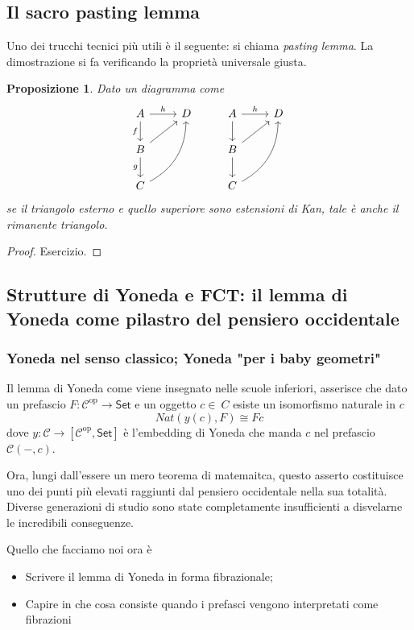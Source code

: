 \documentclass[11pt]{article}
\def\C{\mathcal{C}}
\def\Set{\mathsf{Set}}
\def\opp{\mathrm{op}}
\theoremstyle{reference}
\newtheorem{proposition}[theorem]{Proposizione}
\begin{document}
\subsection{Il sacro pasting lemma}
\label{sec:org734c8d9}

Uno dei trucchi tecnici più utili è il seguente: si chiama
\emph{pasting lemma}. La dimostrazione si fa verificando la
proprietà universale giusta.
\begin{proposition}
Dato un diagramma come
$$
\begin{tikzcd}
|[alias=a]|A \ar[r,"h"]\ar[d,"f"']&|[alias=d]| D &|[alias=a']| A \ar[d]\ar[r,"h"]&|[alias=d']| D \\
B \ar[d,"g"']\ar[ur]&&|[alias=b']| B \ar[d]\ar[ur]\\
|[alias=c]|C \ar[bend right,uur] && C\ar[bend right,uur] 
\end{tikzcd}
$$
se il triangolo esterno e quello superiore sono estensioni di Kan, tale è anche il rimanente triangolo.
\end{proposition}
\begin{proof}
  Esercizio.
\end{proof}
\subsection{Strutture di Yoneda e FCT: il lemma di Yoneda come pilastro del pensiero occidentale}
\label{sec:org4d0f5a4}

\subsubsection{Yoneda nel senso classico; Yoneda "per i baby geometri"}
\label{sec:org1140539}

Il lemma di Yoneda come viene insegnato nelle scuole
inferiori, asserisce che dato un prefascio \(F : \C^\opp \to
\Set\) e un oggetto \(c\in\ C\) esiste un isomorfismo naturale
in \(c\) $$ Nat(y(c), F)\cong Fc $$ dove \(y : \C \to
[\C^\opp,\Set]\) è l'embedding di Yoneda che manda \(c\) nel
prefascio \(\C(-,c)\).

Ora, lungi dall’essere un mero teorema di matemaitca, questo
asserto costituisce uno dei punti più elevati raggiunti dal
pensiero occidentale nella sua totalità. Diverse generazioni
di studio sono state completamente insufficienti a
disvelarne le incredibili conseguenze.

Quello che facciamo noi ora è

\begin{itemize}
\item Scrivere il lemma di Yoneda in forma fibrazionale;
\item Capire in che cosa consiste quando i prefasci vengono
interpretati come fibrazioni
\end{itemize}
\end{document}
